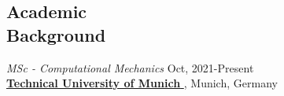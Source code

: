 \documentclass[margin, 10pt]{res} %
\begin{document}
\begin{resume}






 
\section{Academic \\Background}

\emph{MSc - Computational Mechanics} \hfill Oct, 2021-Present \\
\href{https://www.tum.de/en/}{\textbf{Technical University of Munich} }, Munich, Germany 
\begin{itemize}


\end{itemize}
\end{resume}
\end{document}
